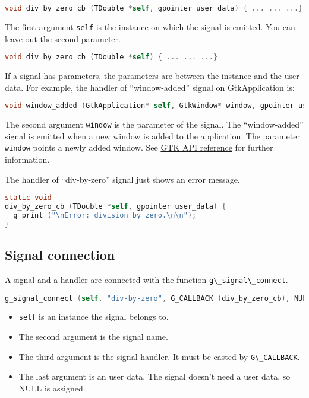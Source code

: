 \begin{lstlisting}[language=C]
void div_by_zero_cb (TDouble *self, gpointer user_data) { ... ... ...}
\end{lstlisting}

The first argument \passthrough{\lstinline!self!} is the instance on
which the signal is emitted. You can leave out the second parameter.

\begin{lstlisting}[language=C]
void div_by_zero_cb (TDouble *self) { ... ... ...}
\end{lstlisting}

If a signal has parameters, the parameters are between the instance and
the user data. For example, the handler of ``window-added'' signal on
GtkApplication is:

\begin{lstlisting}[language=C]
void window_added (GtkApplication* self, GtkWindow* window, gpointer user_data);
\end{lstlisting}

The second argument \passthrough{\lstinline!window!} is the parameter of
the signal. The ``window-added'' signal is emitted when a new window is
added to the application. The parameter \passthrough{\lstinline!window!}
points a newly added window. See
\href{https://docs.gtk.org/gtk4/signal.Application.window-added.html}{GTK
API reference} for further information.

The handler of ``div-by-zero'' signal just shows an error message.

\begin{lstlisting}[language=C]
static void
div_by_zero_cb (TDouble *self, gpointer user_data) {
  g_print ("\nError: division by zero.\n\n");
}
\end{lstlisting}

\subsection{Signal connection}\label{signal-connection}

A signal and a handler are connected with the function
\href{https://docs.gtk.org/gobject/func.signal_connect.html}{\passthrough{\lstinline!g\_signal\_connect!}}.

\begin{lstlisting}[language=C]
g_signal_connect (self, "div-by-zero", G_CALLBACK (div_by_zero_cb), NULL);
\end{lstlisting}

\begin{itemize}
\tightlist
\item
  \passthrough{\lstinline!self!} is an instance the signal belongs to.
\item
  The second argument is the signal name.
\item
  The third argument is the signal handler. It must be casted by
  \passthrough{\lstinline!G\_CALLBACK!}.
\item
  The last argument is an user data. The signal doesn't need a user
  data, so NULL is assigned.
\end{itemize}


